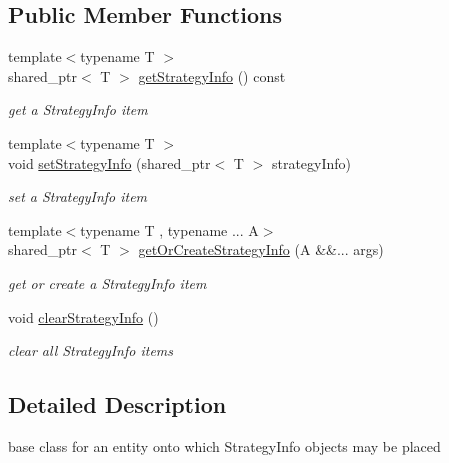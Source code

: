 \subsection*{Public Member Functions}
\begin{DoxyCompactItemize}
\item 
{\footnotesize template$<$typename T $>$ }\\shared\+\_\+ptr$<$ T $>$ \hyperlink{classnfd_1_1StrategyInfoHost_a8b135136ee3b4fea210a3827b1faae15}{get\+Strategy\+Info} () const
\begin{DoxyCompactList}\small\item\em get a Strategy\+Info item \end{DoxyCompactList}\item 
{\footnotesize template$<$typename T $>$ }\\void \hyperlink{classnfd_1_1StrategyInfoHost_aea86d997d5ade02e0567b8368ecbb808}{set\+Strategy\+Info} (shared\+\_\+ptr$<$ T $>$ strategy\+Info)
\begin{DoxyCompactList}\small\item\em set a Strategy\+Info item \end{DoxyCompactList}\item 
{\footnotesize template$<$typename T , typename ... A$>$ }\\shared\+\_\+ptr$<$ T $>$ \hyperlink{classnfd_1_1StrategyInfoHost_a99d0587a80ab78927c626ab6f98c86b9}{get\+Or\+Create\+Strategy\+Info} (A \&\&... args)
\begin{DoxyCompactList}\small\item\em get or create a Strategy\+Info item \end{DoxyCompactList}\item 
void \hyperlink{classnfd_1_1StrategyInfoHost_a9c9c0c4321856a36ac07f152932afcc5}{clear\+Strategy\+Info} ()\hypertarget{classnfd_1_1StrategyInfoHost_a9c9c0c4321856a36ac07f152932afcc5}{}\label{classnfd_1_1StrategyInfoHost_a9c9c0c4321856a36ac07f152932afcc5}

\begin{DoxyCompactList}\small\item\em clear all Strategy\+Info items \end{DoxyCompactList}\end{DoxyCompactItemize}


\subsection{Detailed Description}
base class for an entity onto which Strategy\+Info objects may be placed 

